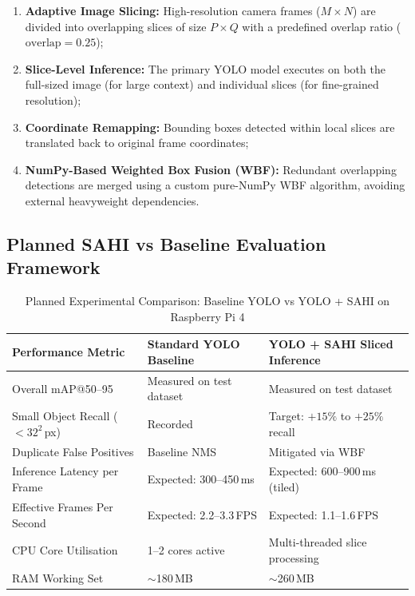 \documentclass[12pt,a4paper]{article}
\begin{document}
\begin{enumerate}[label=\textbf{\arabic*.}]
  \item \textbf{Adaptive Image Slicing:} High-resolution camera frames ($M \times N$) are
  divided into overlapping slices of size $P \times Q$ with a predefined overlap ratio
  ($\text{overlap} = 0.25$);
  \item \textbf{Slice-Level Inference:} The primary YOLO model executes on both the full-sized
  image (for large context) and individual slices (for fine-grained resolution);
  \item \textbf{Coordinate Remapping:} Bounding boxes detected within local slices are translated
  back to original frame coordinates;
  \item \textbf{NumPy-Based Weighted Box Fusion (WBF):} Redundant overlapping detections are merged
  using a custom pure-NumPy WBF algorithm, avoiding external heavyweight dependencies.
\end{enumerate}

\subsection{Planned SAHI vs Baseline Evaluation Framework}

\begin{table}[H]
\centering
\caption{Planned Experimental Comparison: Baseline YOLO vs YOLO + SAHI on Raspberry Pi 4}\label{tab:sahi_eval}
\begin{tabular}{lll}
\toprule
\textbf{Performance Metric} & \textbf{Standard YOLO Baseline} & \textbf{YOLO + SAHI Sliced Inference} \\
\midrule
Overall mAP@50--95          & Measured on test dataset        & Measured on test dataset \\
Small Object Recall ($<32^2$\,px) & Recorded                  & Target: $+15\%$ to $+25\%$ recall \\
Duplicate False Positives   & Baseline NMS                    & Mitigated via WBF \\
Inference Latency per Frame & Expected: 300--450\,ms          & Expected: 600--900\,ms (tiled) \\
Effective Frames Per Second & Expected: 2.2--3.3\,FPS         & Expected: 1.1--1.6\,FPS \\
CPU Core Utilisation        & 1--2 cores active               & Multi-threaded slice processing \\
RAM Working Set             & $\sim$180\,MB                   & $\sim$260\,MB \\
\bottomrule
\end{tabular}
\end{table}
\end{document}
